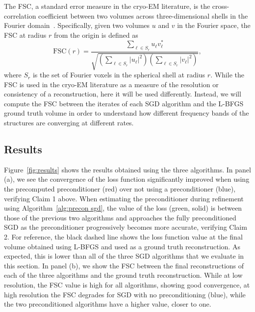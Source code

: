 \documentclass{article}
\begin{document}
The FSC, a standard error measure in the cryo-EM literature, is the cross-correlation 
coefficient between two volumes across three-dimensional shells in the Fourier 
domain~\cite{harauz_exact_1986}. Specifically, given two volumes $u$ and $v$ in 
the Fourier space, the FSC at radius $r$ from the origin is defined as
\begin{equation}
    \text{FSC}(r) = \frac{
        \sum_{\ell \in S_r} u_{\ell} v_{\ell}^*
    }{
        \sqrt{(\sum_{\ell \in S_r} |u_{\ell}|^2)(\sum_{\ell \in S_r} |v_{\ell}|^2)}
    },
    \label{eq:fsc}
\end{equation}
where $S_r$ is the set of Fourier voxels in the spherical shell at radius $r$.
While the FSC is used in the cryo-EM literature as a measure of the resolution or consistency of a reconstruction, here it will be used differently. Instead, we will compute the FSC between the iterates of each SGD algorithm and the L-BFGS ground truth volume in order to understand how different frequency bands of the structures are converging at different rates.

\subsection{Results}
\label{sec:experiments results}

Figure~\ref{fig:results} shows the results obtained using the three algorithms.
In panel (a), we see the convergence of the loss function significantly improved
when using the precomputed preconditioner (red) over not using a preconditioner (blue),
verifying Claim 1 above. 
When estimating the preconditioner during refinement
using Algorithm~\ref{alg:precon sgd}, the value of the loss (green, solid) is between 
those of the previous two algorithms and approaches the fully preconditioned SGD
as the preconditioner progressively becomes more accurate, verifying Claim 2.
For reference, the black dashed line shows the loss function value at the final volume obtained using L-BFGS and used as a ground truth reconstruction. 
As expected, this is lower than all of the three SGD algorithms that we evaluate in this section.
In panel (b), we show the FSC between the final reconstructions of each of the
three algorithms and the ground truth reconstruction. While at low resolution,
the FSC value is high for all algorithms, showing good convergence, at high resolution
the FSC degrades for SGD with no preconditioning (blue), while the two preconditioned
algorithms have a higher value, closer to one. 
\end{document}
